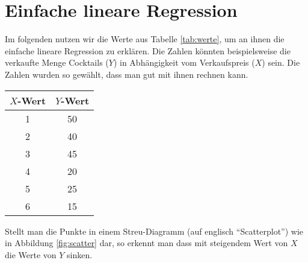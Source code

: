 \documentclass[ngerman, 12pt]{scrartcl}
\begin{document}
\section{Einfache lineare Regression}

Im folgenden nutzen wir die Werte aus Tabelle \ref{tab:werte}, um an ihnen die einfache lineare Regression zu erklären. Die Zahlen könnten beispielsweise die verkaufte Menge Cocktails (\(Y\)) in Abhängigkeit vom Verkaufspreis (\(X\)) sein. Die Zahlen wurden so gewählt, dass man gut mit ihnen rechnen kann. 

\begin{center}
\begin{tabular}{cc} \toprule[2pt]
$X$-Wert & $Y$-Wert \\ \midrule
        1 &50\\
        2 &40\\
        3 &45\\
        4 &20\\
        5 &25\\ 
        6 & 15 \\ \bottomrule[2pt]
\end{tabular}
\end{center}
\label{tab:werte}\vspace*{1em}

Stellt man die Punkte in einem Streu-Diagramm (auf englisch \enquote{Scatterplot}) wie in Abbildung \ref{fig:scatter} dar, so erkennt man dass mit steigendem Wert von $X$ die Werte von $Y$ sinken.
\end{document}
